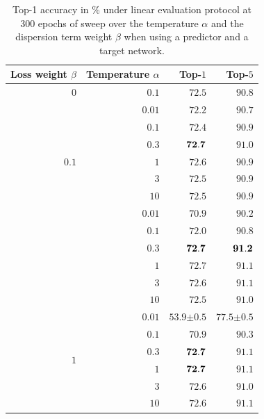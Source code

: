 \begin{table}[ht!]
\centering \small
\begin{tabular}{rrrr}
\toprule
    Loss weight $\beta$ & Temperature $\alpha$ & Top-$1$  & Top-$5$     \\
\midrule
 $0$                    & $0.1$  & $72.5$ & $90.8$ \\
\midrule
 \multirow{7}{*}{$0.1$} & $0.01$ & $72.2$ & $90.7$ \\
                        & $0.1$  & $72.4$ & $90.9$ \\
                        & $0.3$  & $\bf{72.7}$ & $91.0$ \\
                        & $1$    & $72.6$ & $90.9$ \\
                        & $3$    & $72.5$ & $90.9$ \\
                        & $10$   & $72.5$ & $90.9$ \\
\midrule
\multirow{7}{*}{$0.5$}  & $0.01$ & $70.9$ & $90.2$ \\
                        & $0.1$  & $72.0$ & $90.8$ \\
                        & $0.3$  & $\bf{72.7}$ & $\bf{91.2}$ \\
                        &              $1$    & $72.7$ & $91.1$ \\
                        &              $3$    & $72.6$ & $91.1$ \\
                        &             $10$     & $72.5$ & $91.0$ \\
\midrule
\multirow{6}{*}{$1$}    & $0.01$ & $53.9 {\scriptstyle \pm 0.5}$ & $77.5 {\scriptstyle \pm0.5}$ \\
                        & $0.1$  & $70.9$ & $90.3$ \\
                        & $0.3$  & $\bf{72.7}$ & $91.1$ \\
                        &              $1$    & $\bf{72.7}$ & $91.1$ \\
                        &              $3$    & $72.6$ & $91.0$ \\
                        &             $10$    & $72.6$ & $91.1$ \\
\bottomrule
\end{tabular}\vspace{0.25cm}
\captionsetup{width=.9\linewidth}
\caption{\label{tab:app_neg_term_2}Top-1 accuracy in \% under linear evaluation protocol at 300 epochs of sweep over the temperature $\alpha$ and the dispersion term weight $\beta$ when using a predictor and a target network.}
\end{table}


